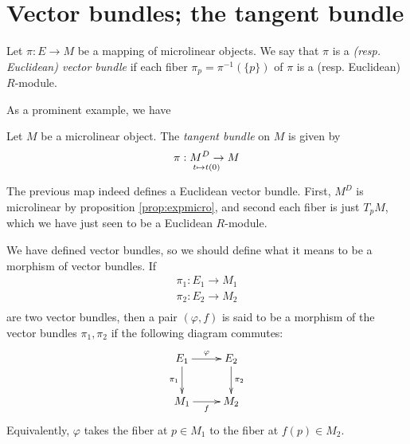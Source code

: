 \section{Vector bundles; the tangent bundle}

\begin{defn}
  Let \( \pi:E\to M \) be a mapping of microlinear objects. We say that \( \pi \) is a \emph{(resp. Euclidean) vector bundle} if each fiber \( \pi_p = \pi^{-1}(\{p\}) \) of \( \pi \) is a (resp. Euclidean) \( R \)-module.
\end{defn}

As a prominent example, we have

\begin{defn}
  Let \( M \) be a microlinear object. The \emph{tangent bundle} on \( M \) is given by
  \begin{equation*}
    \pi:M^D\to M \atop t\mapsto t(0)
  \end{equation*}
\end{defn}

The previous map indeed defines a Euclidean vector bundle. First, \( M^D \) is microlinear by proposition \ref{prop:expmicro}, and second each fiber is just \( T_pM \), which we have just seen to be a Euclidean \( R \)-module.

We have defined vector bundles, so we should define what it means to be a morphism of vector bundles. If
\begin{align*}
  \pi_1:E_1\to M_1 \\
  \pi_2:E_2\to M_2 \\
\end{align*}
are two vector bundles, then a pair \( (\varphi,f) \) is said to be a morphism of the vector bundles \( \pi_1,\pi_2 \) if the following diagram commutes:
\begin{equation*}
  \xymatrix{
    E_1 \ar[d]_{\pi_1} \ar[r]^\varphi & E_2 \ar[d]^{\pi_2} \\
    M_1                \ar[r]_f       & M_2
  }
\end{equation*}
Equivalently, \( \varphi \) takes the fiber at \( p\in M_1 \) to the fiber at \( f(p)\in M_2 \).

